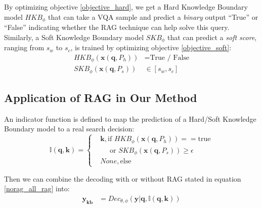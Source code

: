 By optimizing objective \ref{objective_hard}, we get a Hard Knowledge Boundary model $HKB_{\phi}$ that can take a VQA sample and predict a \textit{binary} output ``True'' or ``False'' indicating whether the RAG technique can help solve this query. Similarly, a Soft Knowledge Boundary model $SKB_{\phi}$ that can predict a \textit{soft score}, ranging from $s_w$ to $s_c$, is trained by optimizing objective \ref{objective_soft}:
\begin{equation}
    \begin{aligned}\label{KB}
    HKB_{\phi}(\bm{x}(\bm{q},P_h)) &= \text{True / False} \\
    SKB_{\phi}(\bm{x}(\bm{q},P_s)) &\in [s_w, s_c]
    \end{aligned}
\end{equation}



\subsection{Application of RAG in Our Method}

An indicator function is defined to map the prediction of a Hard/Soft Knowledge Boundary model to a real search decision:
\begin{equation}
\label{search_decision}
    \mathbb{I}(\bm{q}, \bm{k})=\left\{
    \begin{aligned}
    & \bm{k}, \text{if } HKB_{\phi}(\bm{x}(\bm{q},P_h)) == \text{true} \\
    & \quad \text{ or } SKB_{\phi}(\bm{x}(\bm{q},P_s)) \geq \epsilon\\
    & None, \text{else}
    \end{aligned}
    \right.
\end{equation}



Then we can combine the decoding with or without RAG stated in equation \ref{norag_all_rag} into:
\begin{equation}
    \begin{aligned}
    \label{KB_decoding}
    \bm{y_{kb}} &= Dec_{\theta,\phi}(\bm{y}|\bm{q}, \mathbb{I}(\bm{q}, \bm{k}))
    \end{aligned}
\end{equation}











\iffalse

